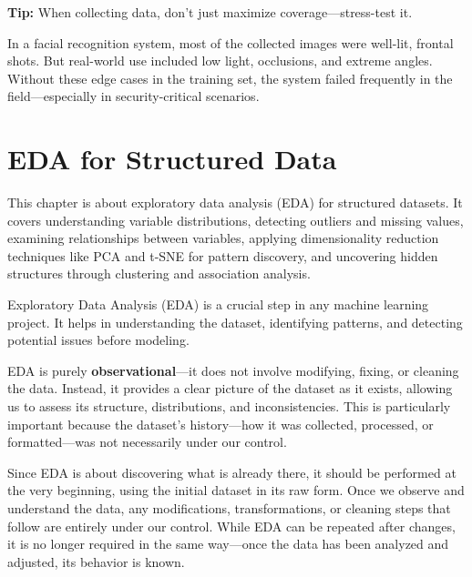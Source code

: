 \documentclass[12pt,openany]{book}
\begin{document}
\textbf{Tip:} When collecting data, don’t just maximize coverage—stress-test it.

\begin{examplebox}
In a facial recognition system, most of the collected images were well-lit, frontal shots. But real-world use included low light, occlusions, and extreme angles. Without these edge cases in the training set, the system failed frequently in the field—especially in security-critical scenarios.
\end{examplebox}




\chapter{EDA for Structured Data}

\begin{summarybox}
This chapter is about exploratory data analysis (EDA) for structured datasets. It covers understanding variable distributions, detecting outliers and missing values, examining relationships between variables, applying dimensionality reduction techniques like PCA and t-SNE for pattern discovery, and uncovering hidden structures through clustering and association analysis.
\end{summarybox}

Exploratory Data Analysis (EDA) is a crucial step in any machine learning 
project. It helps in understanding the dataset, identifying patterns, and 
detecting potential issues before modeling. \newline

EDA is purely \textbf{observational}—it does not involve modifying, fixing, 
or cleaning the data. Instead, it provides a clear picture of the dataset 
as it exists, allowing us to assess its structure, distributions, and 
inconsistencies. This is particularly important because the dataset’s 
history—how it was collected, processed, or formatted—was not necessarily 
under our control. \newline

Since EDA is about discovering what is already there, it should be performed 
at the very beginning, using the initial dataset in its raw form. Once we 
observe and understand the data, any modifications, transformations, or 
cleaning steps that follow are entirely under our control. While EDA can be 
repeated after changes, it is no longer required in the same way—once the 
data has been analyzed and adjusted, its behavior is known. \newline
\end{document}
